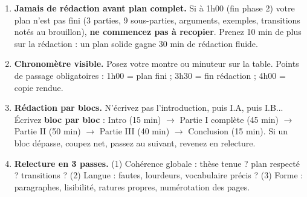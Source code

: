 \documentclass[11pt]{article}
\begin{document}
\begin{methode}
\begin{enumerate}
\item \textbf{Jamais de rédaction avant plan complet.} Si à 1h00 (fin phase 2) votre plan n'est pas fini (3 parties, 9 sous-parties, arguments, exemples, transitions notés au brouillon), \textbf{ne commencez pas à recopier}. Prenez 10 min de plus sur la rédaction : un plan solide gagne 30 min de rédaction fluide.
\item \textbf{Chronomètre visible.} Posez votre montre ou minuteur sur la table. Points de passage obligatoires : 1h00 = plan fini ; 3h30 = fin rédaction ; 4h00 = copie rendue.
\item \textbf{Rédaction par blocs.} N'écrivez pas l'introduction, puis I.A, puis I.B... Écrivez \textbf{bloc par bloc} : Intro (15 min) $\rightarrow$ Partie I complète (45 min) $\rightarrow$ Partie II (50 min) $\rightarrow$ Partie III (40 min) $\rightarrow$ Conclusion (15 min). Si un bloc dépasse, coupez net, passez au suivant, revenez en relecture.
\item \textbf{Relecture en 3 passes.} (1) Cohérence globale : thèse tenue ? plan respecté ? transitions ? (2) Langue : fautes, lourdeurs, vocabulaire précis ? (3) Forme : paragraphes, lisibilité, ratures propres, numérotation des pages.
\end{enumerate}
\end{methode}
\end{document}
